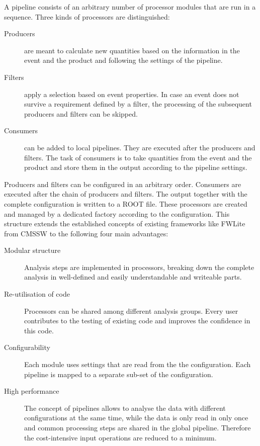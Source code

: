 \documentclass[3p]{elsarticle}
\begin{document}
A pipeline consists of an arbitrary number of processor modules that are run in a sequence.
Three kinds of processors are distinguished:
\begin{description}
\item[Producers] are meant to calculate new quantities based on the information in the event and the product and following the settings of the pipeline.
\item[Filters] apply a selection based on event properties.
In case an event does not survive a requirement defined by a filter, the processing of the subsequent producers and filters can be skipped.
\item[Consumers] can be added to local pipelines.
They are executed after the producers and filters.
The task of consumers is to take quantities from the event and the product and store them in the output according to the pipeline settings.
\end{description}
Producers and filters can be configured in an arbitrary order.
Consumers are executed after the chain of producers and filters.
The output together with the complete configuration is written to a ROOT  file.
These processors are created and managed by a dedicated factory according to the configuration.
This structure extends the established concepts of existing frameworks like FWLite~\cite{FWLite} from CMSSW to the following four main advantages:
\begin{description}
\item[Modular structure] Analysis steps are implemented in processors, breaking down the complete analysis in well-defined and easily understandable and writeable parts.
\item[Re-utilisation of code] Processors can be shared among different analysis groups.
Every user contributes to the testing of existing code and improves the confidence in this code.
\item[Configurability] Each module uses settings that are read from the the configuration.
Each pipeline is mapped to a separate sub-set of the configuration.
\item[High performance] The concept of pipelines allows to analyse the data with different configurations at the same time, while the data is only read in only once and common processing steps are shared in the global pipeline.
Therefore the cost-intensive input operations are reduced to a minimum.
\end{description}
\end{document}
